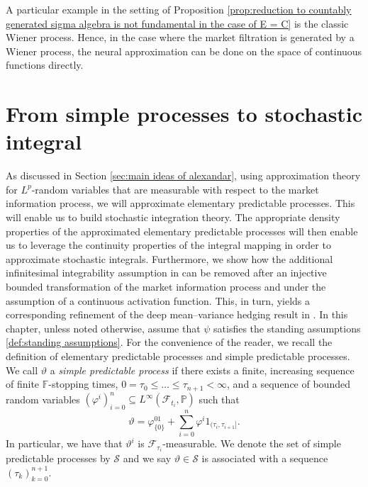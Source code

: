 \documentclass[11pt,a4paper,twoside,openany]{report}
\numberwithin{equation}{section}
\theoremstyle{plain} %
\theoremstyle{definition} %
\theoremstyle{remark} %
\let\parencite\authnumparencite
\begin{document}
A particular example in the setting of Proposition \ref{prop:reduction to countably generated sigma algebra is not fundamental in the case of E = C} 
is the classic Wiener process. Hence, in the case where the market filtration is generated by a Wiener process, the neural approximation can be done on the space of continuous functions directly. 








\section{From simple processes to stochastic integral}\label{sec:From simple processes to stochastic integral}
As discussed in Section \ref{sec:main ideas of alexandar}, using approximation theory for \(L^p\)-random variables that are measurable with respect to the market information process, we will approximate elementary predictable processes. This will enable us to build stochastic integration theory. The appropriate density properties of the approximated elementary predictable processes will then enable us to leverage the continuity properties of the integral mapping in order to approximate stochastic integrals. 
Furthermore, we show how the additional infinitesimal integrability assumption in \parencite[Thm.~5.32]{Arandjelovic2025} can be removed after an injective bounded transformation of the market information process and under the assumption of a continuous activation function. This, in turn, yields a corresponding refinement of the deep mean–variance hedging result in \parencite[Thm.~5.35]{Arandjelovic2025}. In this chapter, unless noted otherwise, assume that \(\psi\) satisfies the standing assumptions \ref{def:standing assumptions}.
For the convenience of the reader, we recall the definition of elementary predictable processes and simple predictable processes. 
\bigbreak
    We call \(\vartheta\) a \textit{simple predictable process} if there exists a finite, increasing sequence of finite \(\mathbb{F}\)-stopping times, \(0=\tau_0\leq\dots\leq\tau_{n+1}<\infty\), and a sequence of bounded random variables \((\varphi^i)_{i=0}^n\subseteq L^{\infty}(\mathcal{F}_{t_i},\mathbb{P})\) such that 
    \begin{equation}\label{eq:simple representation}
        \vartheta = \varphi^01_{\{0\}}+\sum_{i=0}^n\varphi^i1_{(\tau_i,\tau_{i+1}]}.
    \end{equation}
In particular, we have that \(\vartheta^i\) is \(\mathcal{F}_{\tau_i}\)-measurable. We denote the set of simple predictable processes by \(\mathcal{S}\) and we say \(\vartheta\in\mathcal{S}\) is associated with a sequence \((\tau_k)_{k=0}^{n+1}\). 
\end{document}
